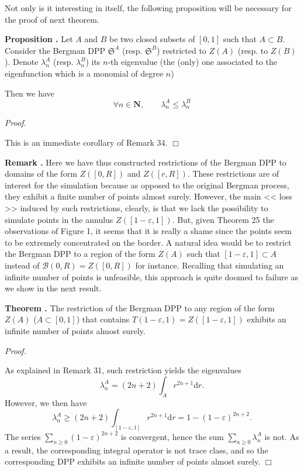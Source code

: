\documentclass[11pt]{article}
\newcommand{\qed}{\hfill$\Box$}
\newcounter{cnt}
\newcommand{\cnt}{\thecnt \stepcounter{cnt}}
\begin{document}
Not only is it interesting in itself, the following proposition will be necessary for the proof of next theorem.

\textbf{Proposition \cnt.} Let $ A $ and $B$ be two closed subsets of $ [0,1] $ such that $ A \subset B $. Consider the Bergman DPP $ \mathfrak S^A $ (resp. $ \mathfrak S^B $) restricted to $Z(A)$ (resp. to $Z(B)$). Denote $ \lambda^A_n $ (resp. $ \lambda^B_n $) its $n$-th eigenvalue (the (only) one associated to the eigenfunction which is a monomial of degree $n$)

Then we have 
\[
    \forall n \in \mathbf N, \qquad \lambda_n^A \leqslant \lambda_n^B
\]

\textit{Proof.} 

This is an immediate corollary of Remark 34. \qed

\textbf{Remark \cnt.} Here we have thus constructed restrictions of the Bergman DPP to domains of the form $ Z([0,R]) $ and $ Z([r,R]) $. These restrictions are of interest for the simulation because as opposed to the original Bergman process, they exhibit a finite number of points almost surely. However, the main << loss >> induced by such restrictions, clearly, is that we lack the possibility to simulate points in the annulus $ Z([1-\varepsilon,1]) $. But, given Theorem 25 the observations of Figure 1, it seems that it is really a shame since the points seem to be extremely concentrated on the border. A natural idea would be to restrict the Bergman DPP to a region of the form $ Z(A) $ such that $ [1-\varepsilon, 1] \subset A$ instead of $ \mathcal B(0,R) = Z([0,R]) $ for instance. Recalling that simulating an infinite number of points is unfeasible, this approach is quite doomed to failure as we show in the next result.

\textbf{Theorem \cnt.} The restriction of the Bergman DPP to any region of the form $ Z(A) $ ($ A \subset [0,1] $) that contains $ T(1-\varepsilon,1) = Z([1-\varepsilon,1]) $ exhibits an infinite number of points almost surely.

\textit{Proof.} 

As explained in Remark 31, such restriction yields the eigenvalues
\[
\lambda_n^A = (2n+2)\int_A r^{2n+1} \mathrm d r .
\]
However, we then have 
\[
\lambda_n^A \geqslant (2n+2) \int_{[1-\varepsilon, 1]} r^{2n+1} \mathrm d r = 1 - (1-\varepsilon)^{2n+2}.
\]
The series $ \displaystyle \sum_{n\ge 0} (1-\varepsilon)^{2n+2} $ is convergent, hence the sum $ \displaystyle \sum_{n \ge 0} \lambda_n^A $ is not. As a result, the corresponding integral operator is not trace class, and so the corresponding DPP exhibits an infinite number of points almost surely. \qed
\end{document}
